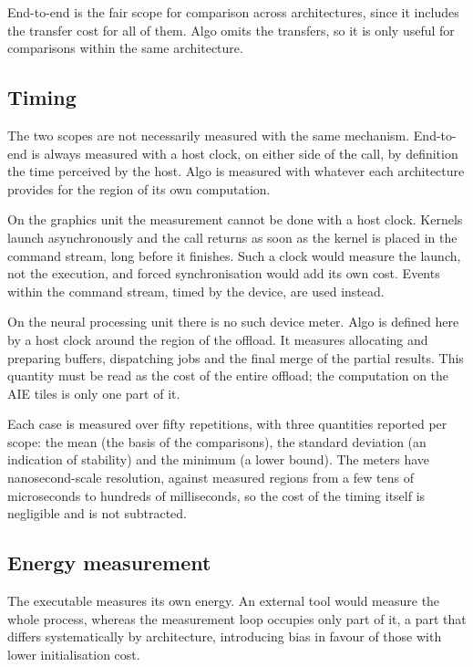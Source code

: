 

End-to-end is the fair scope for comparison across architectures, since it
includes the transfer cost for all of them. Algo omits the transfers, so it is
only useful for comparisons within the same architecture.

\subsection{Timing}
\label{sec:meth-timing}

The two scopes are not necessarily measured with the same mechanism. End-to-end
is always measured with a host clock, on either side of the call, by definition
the time perceived by the host. Algo is measured with whatever each
architecture provides for the region of its own computation.

On the graphics unit the measurement cannot be done with a host clock. Kernels
launch asynchronously and the call returns as soon as the kernel is placed in
the command stream, long before it finishes. Such a clock would measure the
launch, not the execution, and forced synchronisation would add its own cost.
Events within the command stream, timed by the device, are used instead.

On the neural processing unit there is no such device meter. Algo is defined
here by a host clock around the region of the offload. It measures allocating
and preparing buffers, dispatching jobs and the final merge of the partial
results. This quantity must be read as the cost of the entire offload; the
computation on the AIE tiles is only one part of it.

Each case is measured over fifty repetitions, with three quantities reported
per scope: the mean (the basis of the comparisons), the standard deviation (an
indication of stability) and the minimum (a lower bound). The meters have
nanosecond-scale resolution, against measured regions from a few tens of
microseconds to hundreds of milliseconds, so the cost of the timing itself is
negligible and is not subtracted.

\subsection{Energy measurement}
\label{sec:meth-energy}

The executable measures its own energy. An external tool would measure the
whole process, whereas the measurement loop occupies only part of it, a part
that differs systematically by architecture, introducing bias in favour of
those with lower initialisation cost.

